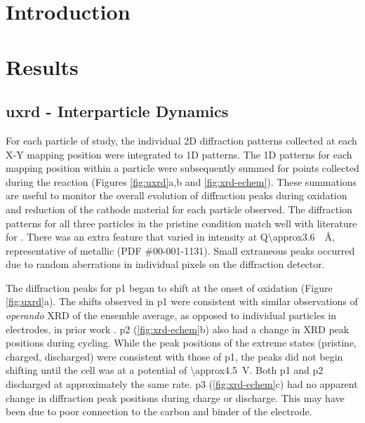 \documentclass{article}
\begin{document}
\maketitle

\section{Introduction}



\section{Results}

\subsection{\Gls{uxrd} - Interparticle Dynamics}

For each particle of study, the individual 2D diffraction patterns
collected at each X-Y mapping position were integrated to 1D
patterns. The 1D patterns for each mapping position within a particle
were subsequently summed for points collected during the reaction
(Figures \ref{fig:uxrd}a,b and \ref{fig:xrd-echem}). These summations
are useful to monitor the overall evolution of diffraction peaks
during oxidation and reduction of the cathode material for each
particle observed. The diffraction patterns for all three particles in
the pristine condition match well with literature for \nca{}
\cite{Robert2015a}. There was an extra feature that varied in
intensity at Q\SI{\approx3.6}{\per\angstrom}, representative of
metallic  (PDF \#00-001-1131). Small extraneous peaks occurred
due to random aberrations in individual pixels on the diffraction
detector.

The diffraction peaks for \gls{p1} began to shift at the onset of
oxidation (Figure \ref{fig:uxrd}a). The shifts observed in \gls{p1}
were consistent with similar observations of \emph{operando} XRD of
the ensemble average, as opposed to individual particles in \nca{}
electrodes, in prior work \cite{Robert2015, Grenier2017}. \gls{p2}
(\ref{fig:xrd-echem}b) also had a change in XRD peak positions during
cycling. While the peak positions of the extreme states (pristine,
charged, discharged) were consistent with those of \gls{p1}, the peaks
did not begin shifting until the cell was at a potential of
\SI{\approx4.5}{\volt}. Both \gls{p1} and \gls{p2} discharged at
approximately the same rate. \gls{p3} (\ref{fig:xrd-echem}c) had no
apparent change in diffraction peak positions during charge or
discharge. This may have been due to poor connection to the carbon and
binder of the electrode.
\end{document}
